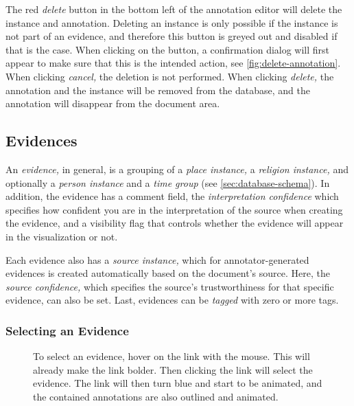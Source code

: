The red \emph{delete} button in the bottom left of the annotation editor will delete the instance and annotation.
Deleting an instance is only possible if the instance is not part of an evidence, and therefore this button is greyed out and disabled if that is the case.
When clicking on the button, a confirmation dialog will first appear to make sure that this is the intended action, see \cref{fig:delete-annotation}.
When clicking \emph{cancel,} the deletion is not performed.
When clicking \emph{delete,} the annotation and the instance will be removed from the database, and the annotation will disappear from the document area.


\subsection{Evidences}
\label{sec:annotator-evidences}

An \emph{evidence,} in general, is a grouping of a \emph{place instance,} a \emph{religion instance,} and optionally a \emph{person instance} and a \emph{time group} (see \cref{sec:database-schema}).
In addition, the evidence has a comment field, the \emph{interpretation confidence} which specifies how confident you are in the interpretation of the source when creating the evidence, and a visibility flag that controls whether the evidence will appear in the visualization or not.

Each evidence also has a \emph{source instance,} which for annotator-generated evidences is created automatically based on the document's source.
Here, the \emph{source confidence,} which specifies the source's trustworthiness for that specific evidence, can also be set.
Last, evidences can be \emph{tagged} with zero or more tags.


\subsubsection{Selecting an Evidence}
\label{sec:evidence-selection}

\begin{figure}[htb]

  \caption{
    To select an evidence, hover on the link with the mouse.
    This will already make the link bolder.
    Then clicking the link will select the evidence.
    The link will then turn blue and start to be animated, and the contained annotations are also outlined and animated.
  }
  \label{fig:select-evidence}
\end{figure}

